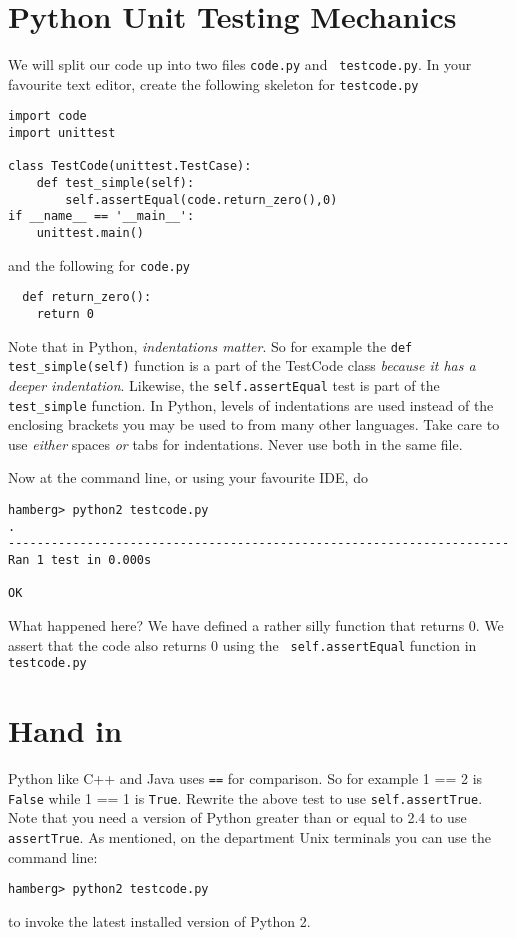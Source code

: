 \documentclass{paper}
\begin{document}
\section*{Python Unit Testing Mechanics}
We will split our code up into two files {\tt code.py} and {\tt
  testcode.py}. In your favourite text editor, create
the following skeleton for {\tt testcode.py}

\begin{lstlisting}
import code
import unittest

class TestCode(unittest.TestCase):
    def test_simple(self):
        self.assertEqual(code.return_zero(),0)
if __name__ == '__main__':
    unittest.main()
\end{lstlisting}

and the following for {\tt code.py}

\begin{lstlisting}
  def return_zero():
    return 0
\end{lstlisting}
Note that in Python, \emph{indentations matter}. So for example the {\tt def test\_simple(self)} function is a part of the TestCode class \emph{because it has a deeper indentation}. Likewise, the {\tt self.assertEqual} test is part of the {\tt test\_simple} function. In Python, levels of indentations are used instead of the enclosing brackets you may be used to from many other languages. Take care to use \emph{either} spaces \emph{or} tabs for indentations. Never use both in the same file.

Now at the command line, or using your favourite IDE, do
\begin{verbatim}
hamberg> python2 testcode.py
.
----------------------------------------------------------------------
Ran 1 test in 0.000s

OK

\end{verbatim}
What happened here? We have defined a rather silly function that
returns 0. We assert that the code also returns 0 using the {\tt
  self.assertEqual} function in {\tt testcode.py}

\section{Hand in}
Python like C++ and Java uses {\tt ==} for comparison. So for example
{1 == 2} is {\tt False} while {1 == 1} is {\tt True}. Rewrite the
above test to use {\tt self.assertTrue}. Note that you need a version
of Python greater than or equal to 2.4 to use {\tt assertTrue}. As mentioned, on the
department Unix terminals you can use the command line:
\begin{verbatim}
hamberg> python2 testcode.py
\end{verbatim}
to invoke the latest installed version of Python 2.
\end{document}
